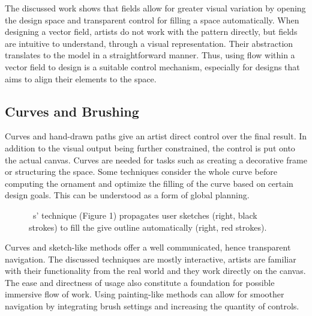 The discussed work shows that fields allow for greater visual variation by opening the design space and transparent control for filling a space automatically. When designing a vector field, artists do not work with the pattern directly, but fields are intuitive to understand, \eg through a visual representation. Their abstraction translates to the model in a straightforward manner. Thus, using flow within a vector field to design is a suitable control mechanism, especially for designs that aims to align their elements to the space.


\subsection{Curves and Brushing}
\label{subsubsec:analysis_creative_means_curves}

Curves and hand-drawn paths give an artist direct control over the final result. In addition to the visual output being further constrained, the control is put onto the actual canvas. Curves are needed for tasks such as creating a decorative frame or structuring the space. Some techniques consider the whole curve before computing the ornament and optimize the filling of the curve based on certain design goals. This can be understood as a form of global planning. 

\begin{figure}[H]
    \centering
    \caption{\label{fig:xing_2014_apr}\citeauthor*{xing_2014_apr}~\cite{xing_2014_apr}s' technique (Figure 1) propagates user sketches (right, black strokes) to fill the give outline automatically (right, red strokes).}
\end{figure}

Curves and sketch-like methods offer a well communicated, hence transparent navigation. The discussed techniques are mostly interactive, artists are familiar with their functionality from the real world and they work directly on the canvas. The ease and directness of usage also constitute a foundation for possible immersive flow of work. Using painting-like methods can allow for smoother navigation by integrating brush settings and increasing the quantity of controls. 

